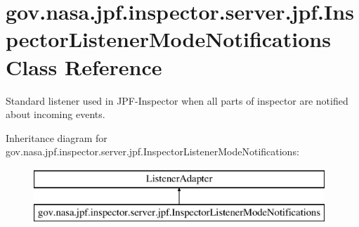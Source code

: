 \hypertarget{classgov_1_1nasa_1_1jpf_1_1inspector_1_1server_1_1jpf_1_1_inspector_listener_mode_notifications}{}\section{gov.\+nasa.\+jpf.\+inspector.\+server.\+jpf.\+Inspector\+Listener\+Mode\+Notifications Class Reference}
\label{classgov_1_1nasa_1_1jpf_1_1inspector_1_1server_1_1jpf_1_1_inspector_listener_mode_notifications}


Standard listener used in J\+P\+F-\/\+Inspector when all parts of inspector are notified about incoming events.  


Inheritance diagram for gov.\+nasa.\+jpf.\+inspector.\+server.\+jpf.\+Inspector\+Listener\+Mode\+Notifications\+:\begin{figure}[H]
\begin{center}
\leavevmode
\includegraphics[height=2.000000cm]{classgov_1_1nasa_1_1jpf_1_1inspector_1_1server_1_1jpf_1_1_inspector_listener_mode_notifications}
\end{center}
\end{figure}
